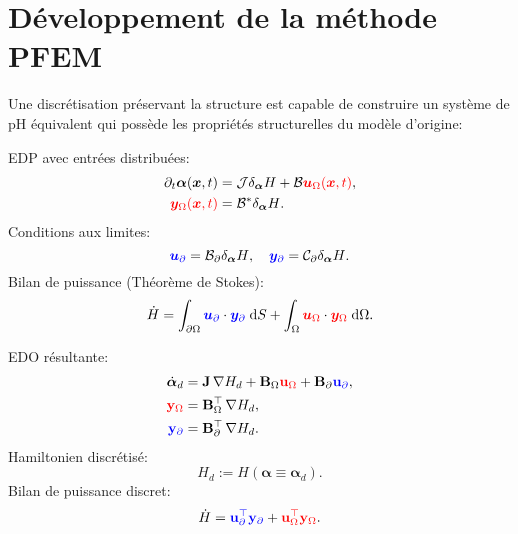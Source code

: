 \section{Développement de la méthode PFEM}
Une discrétisation préservant la structure est capable de construire un système de pH équivalent qui possède les propriétés structurelles du modèle d'origine:
\begin{tcbraster}[raster columns=2, raster equal height]
	\begin{tcolorbox}[width=0.4\textwidth, nobeforeafter, colframe=theme,title=Système pH de dimension infinie]%
		EDP avec entrées distribuées:
		\begin{align*}
		\partial_t {\bm{\alpha}}(\bm{x}, t) &= \mathcal{J} {\displaystyle \delta_{\bm{\alpha}} {H}}+ \mathcal{B} \textcolor{red}{\bm{u}_\Omega(\bm{x}, t)}, \\
		\textcolor{red}{\bm{y}_\Omega(\bm{x}, t)} &= \mathcal{B}^* {\displaystyle  \delta_{\bm{\alpha}} {H}}.
		\end{align*}
		Conditions aux limites: 
		\[\textcolor{blue}{\bm{u}_\partial} = \mathcal{B}_\partial{\displaystyle  \delta_{\bm{\alpha}} {H}}, \quad \textcolor{blue}{\bm{y}_\partial} = \mathcal{C}_\partial {\displaystyle  \delta_{\bm{\alpha}} {H}}. \]
		Bilan de puissance (Théorème de Stokes): 
		\[ \dot{H} = \displaystyle \int_{\partial \Omega} \textcolor{blue}{\bm{u}_\partial} \cdot \textcolor{blue}{\bm{y}_\partial} \d{S} +  \int_{\Omega} \textcolor{red}{\bm{u}_\Omega} \cdot \textcolor{red}{\bm{y}_\Omega} \d{\Omega}.
		\]
	\end{tcolorbox} 
	\begin{tcolorbox}[width=0.4\textwidth, nobeforeafter,  colframe=theme,title=Discretisation préservant la structure]%
		EDO résultante:
		\begin{align*}
		\dot{\bm{\alpha}}_d &= \mathbf{J} \, {\nabla {H}_d} + \mathbf{B}_\Omega \textcolor{red}{\mathbf{u}_\Omega} + \mathbf{B}_\partial \textcolor{blue}{\mathbf{u}_\partial}, \\
		\textcolor{red}{\mathbf{y}_\Omega} &= \mathbf{B}_\Omega^\top \, {\nabla {H}_d}, \\
		\textcolor{blue}{\mathbf{y}_\partial} &= \mathbf{B}_\partial^\top \,{\nabla {H}_d}.
		\end{align*}
		Hamiltonien discrétisé:
		\[
		H_d := H(\bm{\alpha} \equiv \bm{\alpha}_d).
		\]
		Bilan de puissance discret: 
		\[ \dot{H} = \textcolor{blue}{\mathbf{u}_\partial^\top \mathbf{y}_\partial} +  \textcolor{red}{\mathbf{u}_\Omega^\top \mathbf{y}_\Omega}.
		\]
	\end{tcolorbox}
\end{tcbraster}
